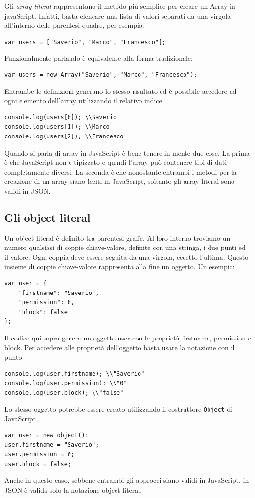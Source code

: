 Gli \emph{array literal} rappresentano il metodo più semplice per creare un Array in javaScript.
Infatti, basta elencare una lista di valori separati da una virgola all'interno delle parentesi quadre, per esempio:
\begin{lstlisting}[style=JavaScriptCode]
var users = ["Saverio", "Marco", "Francesco"];
\end{lstlisting}
Funzionalmente parlando è equivalente alla forma tradizionale:
\begin{lstlisting}[style=JavaScriptCode]
var users = new Array("Saverio", "Marco", "Francesco");
\end{lstlisting}
Entrambe le definizioni generano lo stesso risultato ed è possibile accedere ad ogni elemento dell'array utilizzando il relativo indice 
\begin{lstlisting}[style=JavaScriptCode]
console.log(users[0]); \\Saverio 
console.log(users[1]); \\Marco
console.log(users[2]); \\Francesco
\end{lstlisting}
Quando si parla di array in JavaScript è bene tenere in mente due cose.
La prima è che JavaScript non è tipizzato e quindi l'array può contenere tipi di dati completamente diversi.
La seconda è che nonostante entrambi i metodi per la creazione di un array siano leciti in JavaScript, soltanto gli array literal sono validi in JSON.
\subsection{Gli object literal}
Un object literal è definito tra parentesi graffe.
Al loro interno troviamo un numero qualsiasi di coppie chiave-valore, definite con una stringa, i due punti ed il valore.
Ogni coppia deve essere seguita da una virgola, eccetto l'ultima. 
Questo insieme di coppie chiave-valore rappresenta alla fine un oggetto.
Un esempio:
\begin{lstlisting}[style=JavaScriptCode]
var user = {
	"firstname": "Saverio",
	"permission": 0,
	"block": false
};
\end{lstlisting}
Il codice qui sopra genera un oggetto user con le proprietà firstname, permission e block. 
Per accedere alle proprietà dell'oggetto basta usare la notazione con il punto
\begin{lstlisting}[style=JavaScriptCode]
console.log(user.firstname); \\"Saverio"
console.log(user.permission); \\"0"
console.log(user.block); \\"false"
\end{lstlisting}
Lo stesso oggetto potrebbe essere creato utilizzando il costruttore \texttt{Object} di JavaScript
\begin{lstlisting}[style=JavaScriptCode]
var user = new object():
user.firstname = "Saverio";
user.permission = 0;
user.block = false;
\end{lstlisting}
Anche in questo caso, sebbene entrambi gli approcci siano validi in JavaScript, in JSON è valida solo la notazione object literal.
